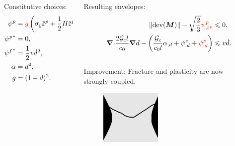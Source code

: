 \begin{frame}
\begin{overlayarea}{\textwidth}{0.4\textwidth}
{\begin{columns}
\begin{column}{0.4\textwidth}
          Constitutive choices:
          \begin{align*}
            \psi^p     & = \textcolor{red}{g} \left( \sigma_y \ep + \dfrac{1}{2} H \ep^2 \right), \\
            {\psi^p}^* & = 0,                                                                     \\
            {\psi^f}^* & = \dfrac{1}{2} v \dot{d}^2,                                              \\
            \alpha     & = d^2,                                                                   \\
            g          & = (1-d)^2.                                                               
          \end{align*}
        \end{column}
        \begin{column}{0.6\textwidth}
          Resulting envelopes:
          \begin{align*}
            \norm{\dev(\bfM)} - \sqrt{\dfrac{2}{3}} \textcolor{red}{\psi^p_{,\ep}}                                                              & \leqslant 0,         \\
            \divergence \dfrac{2\Gc l}{c_0} \grad d - \left( \dfrac{\Gc}{c_0 l}\alpha_{,d} + \psi^e_{,d} + \textcolor{red}{\psi^p_{,d}} \right) & \leqslant v \dot{d}. 
          \end{align*}
          \begin{columns}
            \begin{column}[t]{0.5\textwidth}
              Improvement: Fracture and plasticity are now strongly coupled.
              \begin{figure}
                \centering
                \includegraphics[width=0.45\textwidth]{theory/figures/strong_coupling}
              \end{figure}
            \end{column}
            \begin{column}[t]{0.5\textwidth}

\end{column}
\end{columns}
\end{column}
\end{columns}}
\end{overlayarea}
\end{frame}
